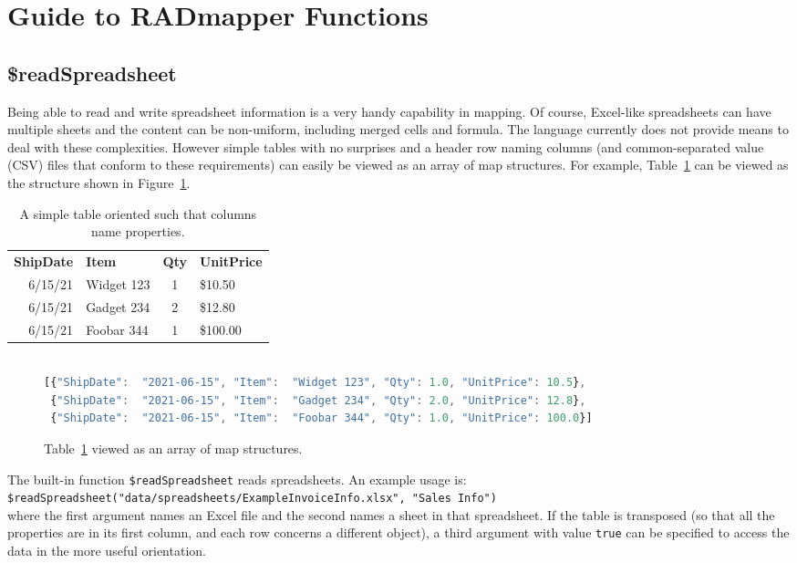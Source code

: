 \documentclass[10pt,letterpaper]{article} %
\newcommand{\stt}[1]{\texttt{#1}} %
\begin{document}
\section{Guide to RADmapper Functions}

\subsection{\$readSpreadsheet}

Being able to read  and write spreadsheet information is a very handy capability in mapping.
Of course, Excel-like spreadsheets can have multiple sheets and the content can be non-uniform, including merged cells and formula.
The language currently does not provide means to deal with these complexities.
However simple tables with no surprises and a header row naming columns (and common-separated value (CSV) files that conform to these requirements) can easily be viewed as an array of map structures.
For example, Table~\ref{table:simple} can be viewed as the structure shown in Figure~\ref{code:simple}.

\begin{table}[H]
  \caption{A simple table oriented such that columns name properties.}
\label{table:simple}
\begin{tabular}{r | l | c | l}

\textbf{ShipDate}& \textbf{Item}& \textbf{Qty}& \textbf{UnitPrice} \\ \hhline{=|=|=|=}
        6/15/21	      & Widget 123   &	1	   &  \$10.50 \\
        6/15/21	      & Gadget 234   &	2	   &  \$12.80 \\
        6/15/21	      & Foobar 344   &	1	   &  \$100.00
\end{tabular}
\end{table}

\begin{figure}[H]
    \caption{Table~\ref{table:simple} viewed as an array of map structures.}
    \label{code:simple}
\begin{lstlisting}[language=JavaScript]

[{"ShipDate":  "2021-06-15", "Item":  "Widget 123", "Qty": 1.0, "UnitPrice": 10.5},
 {"ShipDate":  "2021-06-15", "Item":  "Gadget 234", "Qty": 2.0, "UnitPrice": 12.8},
 {"ShipDate":  "2021-06-15", "Item":  "Foobar 344", "Qty": 1.0, "UnitPrice": 100.0}]
\end{lstlisting}
\end{figure}

The built-in function \stt{\$readSpreadsheet} reads spreadsheets.
An example usage is:\\
\vspace{3mm}
\stt{\$readSpreadsheet("data/spreadsheets/ExampleInvoiceInfo.xlsx", "Sales Info")} \\
\vspace{3mm}
where the first argument names an Excel file and the second names a sheet in that spreadsheet.
If the table is transposed (so that all the properties are in its first column, and each row concerns a different object), a third argument with value \stt{true} can be specified to access the data in the more useful orientation.
\end{document}
